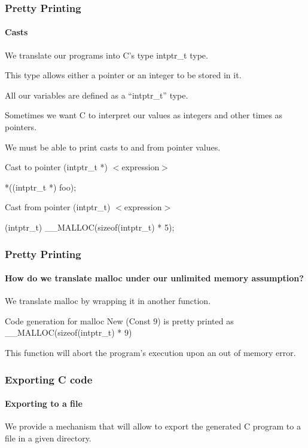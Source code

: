 \begin{frame}
\frametitle{Pretty Printing}
\framesubtitle{Casts}

We translate our programs into C's type intptr\_t type.
\bigskip

This type allows either a pointer or an integer to be stored in it.

All our variables are defined as a ``intptr\_t'' type.

\bigskip

Sometimes we want C to interpret our values as integers and other times as pointers.

We must be able to print casts to and from pointer values.

\bigskip
\pause

\begin{block}{Cast to pointer}
(intptr\_t *) $<$expression$>$

*((intptr\_t *) foo);
\end{block}

\begin{block}{Cast from pointer}
(intptr\_t) $<$expression$>$

(intptr\_t) \_\_MALLOC(sizeof(intptr\_t) * 5);
\end{block}


\end{frame}


\begin{frame}
\frametitle{Pretty Printing}
\framesubtitle{How do we translate malloc under our unlimited memory assumption?}

We translate malloc by wrapping it in another function.

\begin{block}{Code generation for malloc}
New (Const $9$) is pretty printed as \_\_MALLOC(sizeof(intptr\_t) * $9$)
\end{block}

\bigskip

This function will abort the program's execution upon an out of memory error.

\bigskip


\end{frame}


\begin{frame}
\frametitle{Exporting C code}
\framesubtitle{Exporting to a file}

We provide a mechanism that will allow to export the generated C program to a file in a given directory.


\end{frame}
